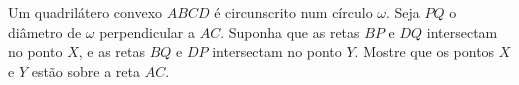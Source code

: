 Um quadrilátero convexo $ABCD$ é circunscrito num círculo $\omega$. Seja $PQ$ o diâmetro de $\omega$ perpendicular a $AC$. Suponha que as retas $BP$ e $DQ$ intersectam no ponto $X$, e as retas $BQ$ e $DP$ intersectam no ponto $Y$. Mostre que os pontos $X$ e $Y$ estão sobre a reta $AC$.
